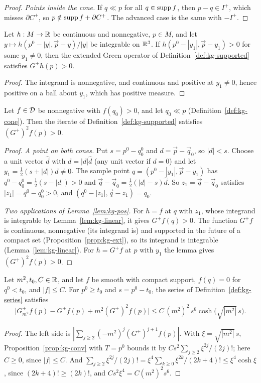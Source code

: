 \begin{extra}
\begin{proof}
\emph{Points inside the cone.} If $q\ll p$ for all $q\in\operatorname{supp} f$, then $p-q\in I^+$, which misses
$\partial C^+$, so $p\notin\operatorname{supp} f+\partial C^+$. The advanced case is the same with $-I^+$.
\end{proof}

\begin{lemma}[Positivity of $G^+$]\label{lem:kg-pos}
Let $h:M\to\mathbb R$ be continuous and nonnegative, $p\in M$, and let $y\mapsto h(p^0-|y|,\vec p-y)/|y|$ be
integrable on $\mathbb R^3$. If $h(p^0-|y_1|,\vec p-y_1)>0$ for some $y_1\ne0$, then the extended Green operator
of Definition~\ref{def:kg-supported} satisfies $G^+h(p)>0$.
\end{lemma}
\begin{proof}
The integrand is nonnegative, and continuous and positive at $y_1\neq0$, hence positive on a ball
about $y_1$, which has positive measure.
\end{proof}

\begin{proposition}[Positivity of $(G^+)^2$]\label{prop:kg-pos2}
Let $f\in\mathcal D$ be nonnegative with $f(q_0)>0$, and let $q_0\ll p$ (Definition~\ref{def:kg-cone}). Then
the iterate of Definition~\ref{def:kg-supported} satisfies $(G^+)^2f(p)>0$.
\end{proposition}
\begin{proof}
\emph{A point on both cones.} Put $s=p^0-q_0^0$ and $d=\vec p-\vec q_0$, so $|d|<s$. Choose a
unit vector $\hat d$ with $d=|d|\hat d$ (any unit vector if $d=0$) and let
$y_1=\tfrac12(s+|d|)\hat d\ne0$. The sample point $q=(p^0-|y_1|,\vec p-y_1)$ has
$q^0-q_0^0=\tfrac12(s-|d|)>0$ and $\vec q-\vec q_0=\tfrac12(|d|-s)\hat d$. So $z_1=\vec q-\vec q_0$
satisfies $|z_1|=q^0-q_0^0>0$, and $(q^0-|z_1|,\vec q-z_1)=q_0$.

\emph{Two applications of Lemma~\ref{lem:kg-pos}.} For $h=f$ at $q$ with $z_1$, whose integrand is
integrable by Lemma~\ref{lem:kg-linear}, it gives $G^+f(q)>0$. The function $G^+f$ is continuous,
nonnegative (its integrand is) and supported in the future of a compact set
(Proposition~\ref{prop:kg-ext}), so its integrand is integrable (Lemma~\ref{lem:kg-linear}). For
$h=G^+f$ at $p$ with $y_1$ the lemma gives $(G^+)^2f(p)>0$.
\end{proof}

\begin{lemma}\label{lem:kg-tail}
Let $m^2,t_0,C\in\mathbb R$, and let $f$ be smooth with compact support, $f(q)=0$ for $q^0<t_0$, and
$|f|\le C$. For $p^0\ge t_0$ and $s=p^0-t_0$, the series of Definition~\ref{def:kg-series} satisfies
\[
\bigl|G^+_{m^2}f(p)-G^+f(p)+m^2(G^+)^2f(p)\bigr|\le C\,(m^2)^2\,s^6\cosh\bigl(\sqrt{|m^2|}\,s\bigr).
\]
\end{lemma}
\begin{proof}
The left side is $|\sum_{j\ge2}(-m^2)^j(G^+)^{j+1}f(p)|$. With $\xi=\sqrt{|m^2|}\,s$,
Proposition~\ref{prop:kg-conv} with $T=p^0$ bounds it by $Cs^2\sum_{j\ge2}\xi^{2j}/(2j)!$; here $C\ge0$,
since $|f|\le C$. And
$\sum_{j\ge2}\xi^{2j}/(2j)!=\xi^4\sum_{k\ge0}\xi^{2k}/(2k+4)!\le\xi^4\cosh\xi$, since $(2k+4)!\ge(2k)!$,
and $Cs^2\xi^4=C(m^2)^2s^6$.
\end{proof}


\end{extra}
